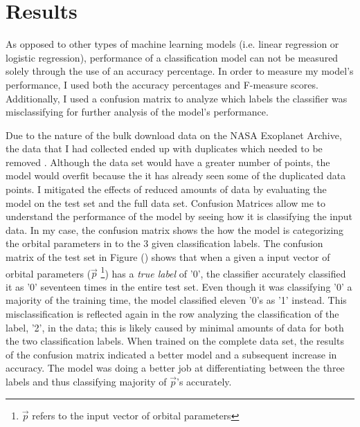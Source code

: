 \documentclass[12pt]{article}
\begin{document}
\section{Results}
\label{sec:results}
As opposed to other types of machine learning models (i.e. linear regression or logistic regression), performance of a classification model can not be measured solely through the use of an accuracy percentage. In order to measure my model's performance, I used both the accuracy percentages and F-measure scores. Additionally, I used a confusion matrix to analyze which labels the classifier was misclassifying for further analysis of the model's performance.\par
 Due to the nature of the bulk download data on the NASA Exoplanet Archive, the data that I had collected ended up with duplicates which needed to be removed \cite{akeson2013nasa}. Although the data set would have a greater number of points, the model would overfit because the it has already seen some of the duplicated data points. I mitigated the effects of reduced amounts of data by evaluating the model on the test set and the full data set. Confusion Matrices allow me to understand the performance of the model by seeing how it is classifying the input data. In my case, the confusion matrix shows the how the model is categorizing the orbital parameters in to the 3 given classification labels. The confusion matrix of the test set in Figure () shows that when a given a input vector of orbital parameters ($ \vec{p} $ \footnote{$\vec{p}$ refers to the input vector of orbital parameters}) has a \emph{true label} of '0', the classifier accurately classified it as '0' seventeen times in the entire test set. Even though it was classifying '0' a majority of the training time, the model classified eleven '0's as '1' instead. This misclassification is reflected again in the row analyzing the classification of the label, '2', in the data; this is likely caused by minimal amounts of data for both the two classification labels. When trained on the complete data set, the results of the confusion matrix indicated a better model and a subsequent increase in accuracy. The model was doing a better job at differentiating between the three labels and thus classifying majority of $\vec{p}$'s accurately. \par
\end{document}

